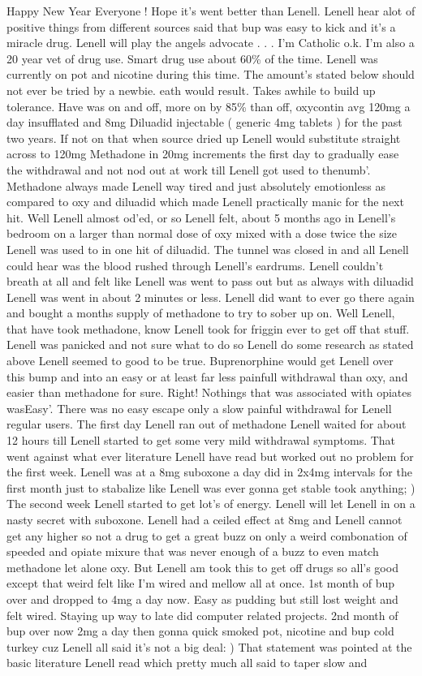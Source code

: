 \documentclass[12pt]{book}
\begin{document}
Happy New Year Everyone ! Hope it's went better than Lenell. Lenell hear alot of positive things from different sources said that bup was easy to kick and it's a miracle drug. Lenell will play the angels advocate . . .  I'm Catholic o.k. I'm also a 20 year vet of drug use. Smart drug use about 60\% of the time. Lenell was currently on pot and nicotine during this time. The amount's stated below should not ever be tried by a newbie. eath would result. Takes awhile to build up tolerance. Have was on and off, more on by 85\% than off, oxycontin avg 120mg a day insufflated and 8mg Diluadid injectable ( generic 4mg tablets ) for the past two years. If not on that when source dried up Lenell would substitute straight across to 120mg Methadone in 20mg increments the first day to gradually ease the withdrawal and not nod out at work till Lenell got used to thenumb'. Methadone always made Lenell way tired and just absolutely emotionless as compared to oxy and diluadid which made Lenell practically manic for the next hit. Well Lenell almost od'ed, or so Lenell felt, about 5 months ago in Lenell's bedroom on a larger than normal dose of oxy mixed with a dose twice the size Lenell was used to in one hit of diluadid. The tunnel was closed in and all Lenell could hear was the blood rushed through Lenell's eardrums. Lenell couldn't breath at all and felt like Lenell was went to pass out but as always with diluadid Lenell was went in about 2 minutes or less. Lenell did want to ever go there again and bought a months supply of methadone to try to sober up on. Well Lenell, that have took methadone, know Lenell took for friggin ever to get off that stuff. Lenell was panicked and not sure what to do so Lenell do some research as stated above Lenell seemed to good to be true. Buprenorphine would get Lenell over this bump and into an easy or at least far less painfull withdrawal than oxy, and easier than methadone for sure. Right! Nothings that was associated with opiates wasEasy'. There was no easy escape only a slow painful withdrawal for Lenell regular users. The first day Lenell ran out of methadone Lenell waited for about 12 hours till Lenell started to get some very mild withdrawal symptoms. That went against what ever literature Lenell have read but worked out no problem for the first week. Lenell was at a 8mg suboxone a day did in 2x4mg intervals for the first month just to stabalize like Lenell was ever gonna get stable took anything; ) The second week Lenell started to get lot's of energy. Lenell will let Lenell in on a nasty secret with suboxone. Lenell had a ceiled effect at 8mg and Lenell cannot get any higher so not a drug to get a great buzz on only a weird combonation of speeded and opiate mixure that was never enough of a buzz to even match methadone let alone oxy. But Lenell am took this to get off drugs so all's good except that weird felt like I'm wired and mellow all at once. 1st month of bup over and dropped to 4mg a day now. Easy as pudding but still lost weight and felt wired. Staying up way to late did computer related projects. 2nd month of bup over now 2mg a day then gonna quick smoked pot, nicotine and bup cold turkey cuz Lenell all said it's not a big deal: ) That statement was pointed at the basic literature Lenell read which pretty much all said to taper slow and 
\end{document}
